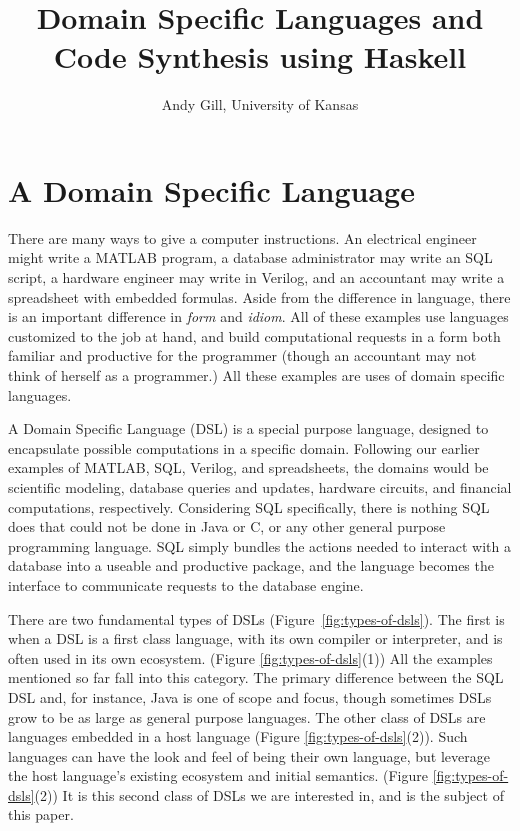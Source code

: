 \documentclass[11pt]{article}
\begin{document}
\title{Domain Specific Languages and Code Synthesis using Haskell}
\author{Andy Gill, University of Kansas}
\maketitle

\section{A Domain Specific Language}

There are many ways to give a computer instructions.
%
An electrical engineer might write a MATLAB program,
a database administrator may write an SQL script,
a hardware engineer may write in Verilog,
and an accountant may write a spreadsheet
with embedded formulas.
%
Aside from the difference in language, there is an
important difference in {\em form\/} and {\em idiom\/}.
%
All of these examples use languages
customized to the job at hand, and build computational
requests in a form both familiar and productive
for the programmer (though an accountant may
not think of herself as a programmer.)
All these examples are uses of domain specific languages.

A Domain Specific Language (DSL) is a special purpose language,
designed to encapsulate possible computations in a specific
domain. Following our earlier examples of MATLAB, SQL,
Verilog, and spreadsheets, the domains would be scientific modeling,
database queries and updates, hardware circuits, and financial computations, respectively.
Considering SQL specifically, there is nothing SQL does that could not
be done in Java or C, or any other general purpose programming
language. SQL simply bundles the actions needed to
interact with a database into a useable and productive package,
and the language becomes the interface to communicate requests
to the database engine.

There are two fundamental types of DSLs
(Figure~\ref{fig:types-of-dsls}).
%
The first is when a DSL is a first class language,
with its own compiler or interpreter, and is often used in
its own ecosystem. (Figure \ref{fig:types-of-dsls}(1)) 
All the examples mentioned so far fall
into this category. The primary difference between the SQL DSL and,
for instance, Java is one of scope and focus, though sometimes
DSLs grow to be as large as general purpose languages.
%
The other class of DSLs are languages
embedded in a host language (Figure \ref{fig:types-of-dsls}(2)). 
Such languages
can have the look and feel of being their own language,
but leverage the host language's existing
ecosystem and initial semantics. 
(Figure \ref{fig:types-of-dsls}(2))
It is this second
class of DSLs we are interested in, and is the subject of
this paper.
\end{document}
